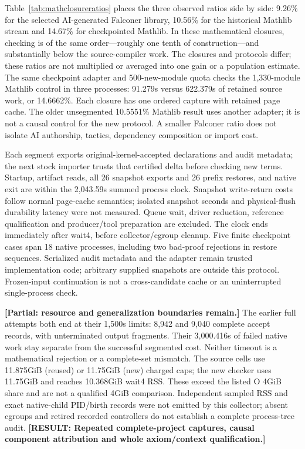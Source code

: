 \documentclass[10pt,twocolumn]{article}
\newcommand{\missing}[1]{\textbf{[RESULT: #1]}}
\newcommand{\partialev}[1]{\textbf{[Partial: #1]}}
\begin{document}
Table~\ref{tab:mathclosureratios} places the three observed ratios side by side:
9.26\% for the selected AI-generated Falconer library, 10.56\% for the
historical Mathlib stream and 14.67\% for checkpointed Mathlib.
In these mathematical closures, checking is of the same order---roughly
one tenth of construction---and substantially below the source-compiler work.
The closures and protocols differ; these ratios are not multiplied or
averaged into one gain or a population estimate.
The same checkpoint adapter and 500-new-module quota checks the 1,330-module
Mathlib control in three processes: 91.279s versus 622.379s of retained source
work, or 14.6662\%. Each closure has one ordered capture with retained page
cache. The older unsegmented 10.5551\% Mathlib result uses another adapter;
it is not a causal control for the new protocol. A smaller Falconer ratio
does not isolate AI authorship, tactics, dependency composition or import cost.

Each segment exports original-kernel-accepted declarations and audit metadata;
the next stock importer trusts that certified delta before checking new terms.
Startup, artifact reads, all 26 snapshot exports and 26 prefix restores,
and native exit are within the 2,043.59s summed process clock.
Snapshot write-return costs follow normal page-cache semantics; isolated
snapshot seconds and physical-flush durability latency were not measured. Queue wait, driver reduction, reference
qualification and producer/tool preparation are excluded.
The clock ends immediately after wait4, before collector/cgroup cleanup.
Five finite checkpoint cases span 18 native processes, including two bad-proof
rejections in restore sequences. Serialized audit metadata and the adapter
remain trusted implementation code; arbitrary supplied snapshots are outside
this protocol. Frozen-input continuation is not a cross-candidate cache or
an uninterrupted single-process check.

\partialev{resource and generalization boundaries remain.}
The earlier full attempts both end at their 1,500s limits: 8,942 and 9,040 complete
accept records, with unterminated output fragments. Their 3,000.416s of failed
native work stay separate from the successful segmented cost.
Neither timeout is a mathematical rejection or a complete-set mismatch.
The source cells use 11.875GiB (reused) or 11.75GiB (new) charged caps;
the new checker uses 11.75GiB and reaches 10.368GiB wait4 RSS.
These exceed the listed O 4GiB share and are not a qualified 4GiB comparison.
Independent sampled RSS and exact native-child PID/birth records were not
emitted by this collector; absent cgroups and retired recorded controllers
do not establish a complete process-tree audit.
\missing{Repeated complete-project captures, causal component attribution
and whole axiom/context qualification.}
\end{document}
